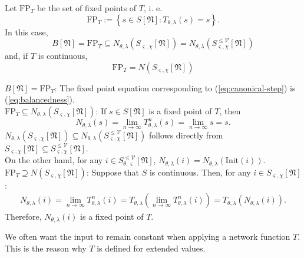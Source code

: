 \documentclass[a4paper,11pt]{report}
\newcommand{\const}{\varsigma} %
\newcommand{\var}{\chi} %
\newcommand{\In}{\text{Init}}
\begin{document}
\begin{Lem}\label{lem:fixed-states}
Let $\text{FP}_T$ be the set of fixed points of $T$, i. e.
\[
\text{FP}_T:=\left\{s\in S[\mathfrak{N}]:T_{\theta,\lambda}(s)=s\right\}.
\]
In this case,
\[
B[\mathfrak{N}]=\text{FP}_T\subseteq N_{\theta,\lambda}\left(S_{\const,\var}[\mathfrak{N}]\right)=N_{\theta,\lambda}\left(S^{\le\mathcal{V}}_{\const,\var}[\mathfrak{N}]\right)
\]
and, if $T$ is continuous, 
\[
\text{FP}_T=N\left(S_{\const,\var}[\mathfrak{N}]\right)
\]
\end{Lem}

\begin{Bew}
$B[\mathfrak{N}]=\text{FP}_T$: The fixed point equation corresponding to (\ref{eq:canonical-step}) is (\ref{eq:balancedness}).\\
$\text{FP}_T\subseteq N_{\theta,\lambda}\left(S_{\const,\var}[\mathfrak{N}]\right)$: If $s\in S[\mathfrak{N}]$ is a fixed point of $T$, then
\[
N_{\theta,\lambda}(s)=\lim_{n\to\infty}T_{\theta,\lambda}^n(s)=\lim_{n\to\infty}s=s.
\]
 $N_{\theta,\lambda}\left(S_{\const,\var}[\mathfrak{N}]\right)\subseteq N_{\theta,\lambda}\left(S^{\le\mathcal{V}}_{\const,\var}[\mathfrak{N}]\right)$ follows directly from $S_{\const,\var}[\mathfrak{N}]\subseteq S_{\const,\var}^{\le\mathcal{V}}[\mathfrak{N}]$.\\
On the other hand, for any $i\in S^{\le\mathcal{V}}_{\theta,\const}[\mathfrak{N}]$, $N_{\theta,\lambda}(i)=N_{\theta,\lambda}\left(\In(i)\right)$.\\
$\text{FP}_T\supseteq N\left(S_{\const,\var}[\mathfrak{N}]\right)$: Suppose that $S$ is continuous. Then, for any $i\in S_{\const,\var}[\mathfrak{N}]$:
\begin{align*}
N_{\theta,\lambda}(i)=\lim_{n\to\infty}T_{\theta,\lambda}^n(i)=T_{\theta,\lambda}\left(\lim_{n\to\infty}T^n_{\theta,\lambda}(i)\right)=T_{\theta,\lambda}\left(N_{\theta,\lambda}(i)\right).
\end{align*}
Therefore, $N_{\theta,\lambda}(i)$ is a fixed point of $T$.
\end{Bew}

\begin{Par}
We often want the input to remain constant when applying a network function $T$. This is the reason why $T$ is defined for extended values.
\end{Par}
\end{document}

